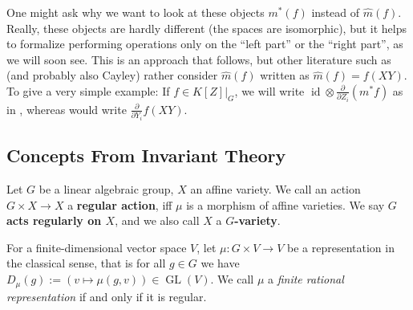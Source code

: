 \begin{remark}
One might ask why we want to look at these objects $ m^\ast \left( f \right) $ instead of $ \hat{m} \left( f \right) $.
Really, these objects are hardly different (the spaces are isomorphic), but it helps to formalize performing operations only on the ``left part'' or the ``right part'', as we will soon see.
This is an approach that \cite{DK15} follows, but other literature such as \cite{Stu08} (and probably also Cayley) rather consider $ \hat{m} \left( f \right) $ written as $ \hat{m} \left( f \right) = f (XY) $.
To give a very simple example:
If $f \in \left. K[Z] \right|_G$, we will write $\operatorname{id} \otimes \frac{\partial}{\partial Z_i} (m^\ast f)$ as in \cite{DK15}, whereas \cite{Stu08} would write $\frac{\partial}{\partial Y_i} f(XY)$.
\end{remark}

\subsection{Concepts From Invariant Theory}

\begin{definition}
  Let $G$ be a linear algebraic group, $X$ an affine variety.
  We call an action $G \times X \longrightarrow X$ a \textbf{regular action}, iff $\mu$ is a morphism of affine varieties.
  We say \textbf{$ G $ acts regularly on $ X $}, and we also call $X$ a \textbf{$G$-variety}.

  For a finite-dimensional vector space $V$, let $\mu \colon G \times V \longrightarrow V$ be a representation in the classical sense, that is for all $g \in G$ we have $D_\mu (g) := (v \mapsto \mu(g,v)) \in \operatorname{GL}(V)$.
  We call $\mu$ a \textit{finite rational representation} if and only if it is regular.
  
\end{definition}

